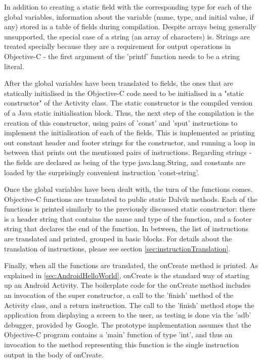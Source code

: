 \documentclass[parskip]{cs4rep}
\begin{document}
In addition to creating a static field with the corresponding type for each of the global variables, information about the variable (name, type, and initial value, if any) stored in a table of fields during compilation. Despite arrays being generally unsupported, the special case of a string (an array of characters) is. Strings are treated specially because they are a requirement for output operations in Objective-C - the first argument of the 'printf' function needs to be a string literal.

After the global variables have been translated to fields, the ones that are statically initialised in the Objective-C code need to be initialised in a "static constructor" of the Activity class. The static constructor is the compiled version of a Java static initialisation block. Thus, the next step of the compilation is the creation of this constructor, using pairs of 'const' and 'sput' instructions to implement the initialisation of each of the fields. This is implemented as printing out constant header and footer strings for the constructor, and running a loop in between that prints out the mentioned pairs of instructions. Regarding strings - the fields are declared as being of the type java.lang.String, and constants are loaded by the surprisingly convenient instruction 'const-string'.

Once the global variables have been dealt with, the turn of the functions comes. Objective-C functions are translated to public static Dalvik methods. Each of the functions is printed similarly to the previously discussed static constructor: there is a header string that contains the name and type of the function, and a footer string that declares the end of the function. In between, the list of instructions are translated and printed, grouped in basic blocks. For details about the translation of instructions, please see section \ref{sec:instructionTranslation}.

Finally, when all the functions are translated, the onCreate method is printed. As explained in \ref{sec:AndroidHelloWorld}, onCreate is the standard way of starting up an Android Activity. The boilerplate code for the onCreate method includes an invocation of the super constructor, a call to the 'finish' method of the Activity class, and a return instruction. The call to the 'finish' method stops the application from displaying a screen to the user, as testing is done via the 'adb' debugger, provided by Google. The prototype implementation assumes that the Objective-C program contains a 'main' function of type 'int', and thus an invocation to the method representing this function is the single instruction output in the body of onCreate.
\end{document}
